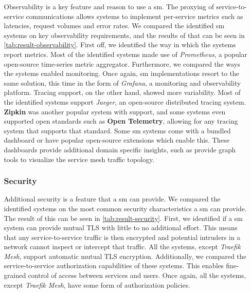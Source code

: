 Observability is a key feature and reason to use a \gls{sm}. The proxying of service-to-service communications allows systems to implement per-service metrics such as latencies, request volumes and error rates. We compared the identified \gls{sm} systems on key observability requirements, and the results of that can be seen in \cref{tab:result-observability}. First off, we identified the way in which the systems report metrics. Most of the identified systems made use of \textit{Prometheus}, a popular open-source time-series metric aggregator.  Furthermore, we compared the ways the systems enabled monitoring. Once again, \gls{sm} implementations resort to the same solution, this time in the form of \textit{Grafana}, a monitoring and observability platform. Tracing support, on the other hand, showed more variability. Most of the identified systems support \textit{Jaeger}, an open-source distributed tracing system. \textbf{Zipkin} was another popular system with support, and some systems even supported open standards such as \textbf{Open Telemetry}, allowing for any tracing system that supports that standard. Some \gls{sm} systems come with a bundled dashboard or have popular open-source extensions which enable this. These dashboards provide additional domain specific insights, such as provide graph tools to visualize the service mesh traffic topology. 

\subsubsection{Security}
\label{sec:survey:results:comparison:security}



Additional security is a feature that a \gls{sm} can provide. We compared the identified systems on the most common security characteristics a \gls{sm} can provide. The result of this can be seen in \cref{tab:result-security}. First, we identified if a \gls{sm} system can provide mutual TLS with little to no additional effort. This means that any service-to-service traffic is then encrypted and potential intruders in a network cannot inspect or intercept that traffic. All the systems, except \textit{Traefik Mesh}, support automatic mutual TLS encryption. Additionally, we compared the service-to-service authorization capabilities of these systems. This enables fine-grained control of access between services and users. Once again, all the systems, except \textit{Traefik Mesh}, have some form of authorization policies.

